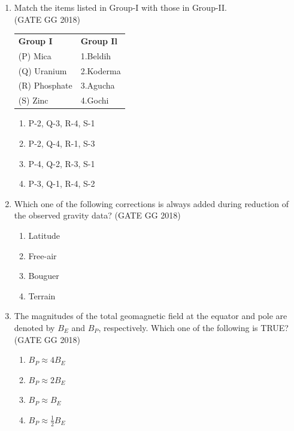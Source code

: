 \documentclass[journal]{IEEEtran}
\begin{document}
\begin{enumerate}[start=1]
\item Match the items listed in Group-I with those in Group-II.\\
\hspace*{15.7cm}(GATE GG 2018)\\
\begin{tabular}{ l l }
\textbf{Group I} & \textbf{Group Il}\\
(P) Mica & 1.Beldih\\
(Q) Uranium & 2.Koderma\\
(R) Phosphate & 3.Agucha\\
(S) Zinc & 4.Gochi
\end{tabular}
\begin{multicols}{2}
\begin{enumerate}
\item P-2, Q-3, R-4, S-1
\item P-2, Q-4, R-1, S-3
\item P-4, Q-2, R-3, S-1
\item P-3, Q-1, R-4, S-2
\end{enumerate}
\end{multicols}

\item Which one of the following corrections is always added during reduction of the observed gravity data?  
\hfill(GATE GG 2018)
\begin{multicols}{4}
\begin{enumerate}
\item Latitude
\item Free-air
\item Bouguer
\item Terrain
\end{enumerate}
\end{multicols}

\item The magnitudes of the total geomagnetic field at the equator and pole are denoted by $B_E$ and $B_P$, respectively. Which one of the following is TRUE?  
\hfill(GATE GG 2018)
\begin{multicols}{2}
\begin{enumerate}
\item $B_P \approx 4 B_E$
\item $B_P \approx 2 B_E$
\item $B_P \approx B_E$
\item $B_P \approx \tfrac{1}{2} B_E$
\end{enumerate}
\end{multicols}


\end{enumerate}
\end{document}
